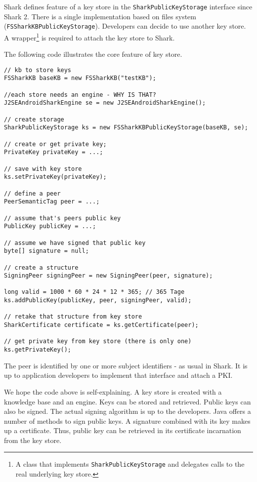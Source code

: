 Shark defines feature of a key store in the {\tt SharkPublicKeyStorage} interface since Shark 2. There is a single implementation based on files system ({\tt FSSharkKBPublicKeyStorage}). Developers can decide to use another key store. A wrapper\footnote{A class that implements {\tt SharkPublicKeyStorage} and delegates calls to the real underlying key store.} is required to attach the key store to Shark.

The following code illustrates the core feature of key store.

\begin{verbatim}
// kb to store keys
FSSharkKB baseKB = new FSSharkKB("testKB");

//each store needs an engine - WHY IS THAT?
J2SEAndroidSharkEngine se = new J2SEAndroidSharkEngine();

// create storage
SharkPublicKeyStorage ks = new FSSharkKBPublicKeyStorage(baseKB, se);

// create or get private key;
PrivateKey privateKey = ...;

// save with key store
ks.setPrivateKey(privateKey);

// define a peer
PeerSemanticTag peer = ...;

// assume that's peers public key
PublicKey publicKey = ...;

// assume we have signed that public key
byte[] signature = null;

// create a structure
SigningPeer signingPeer = new SigningPeer(peer, signature);

long valid = 1000 * 60 * 24 * 12 * 365; // 365 Tage
ks.addPublicKey(publicKey, peer, signingPeer, valid);

// retake that structure from key store
SharkCertificate certificate = ks.getCertificate(peer);

// get private key from key store (there is only one)
ks.getPrivateKey();
\end{verbatim}

The peer is identified by one or more subject identifiers - as usual in Shark.
It is up to application developers to implement that interface and attach a PKI.

We hope the code above is self-explaining. A key store is created with a knowledge base and an engine. Keys can be stored and retrieved. Public keys can also be signed. The actual signing algorithm is up to the developers. Java offers a number of methods to sign public keys. A signature combined with its key makes up a certificate. Thus, public key can be retrieved in its certificate incarnation from the key store.

